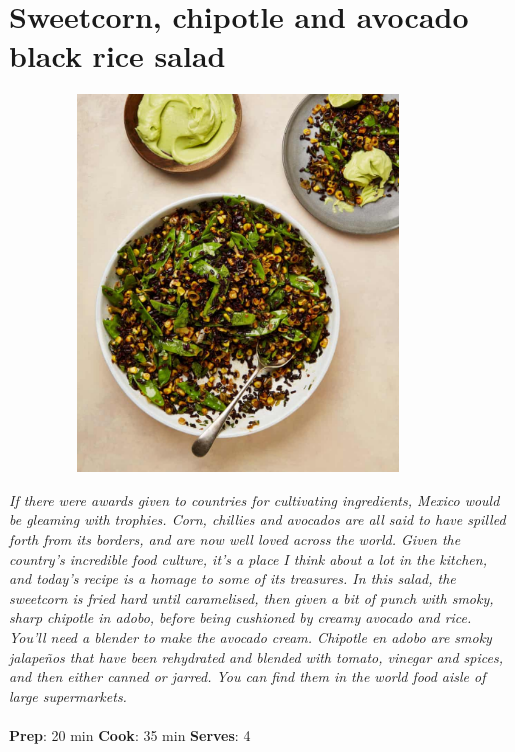 \documentclass{book}
\begin{document}
\section{Sweetcorn, chipotle and avocado black rice salad}
\begin{figure}
\centering\includegraphics[width=10cm,height=10cm,keepaspectratio]{Recipe_Pictures/Sweetcorn,_chipotle_and_avocado_black_rice_salad.png}
\end{figure}
\emph{If there were awards given to countries for cultivating ingredients, Mexico would be gleaming with trophies. Corn, chillies and avocados are all said to have spilled forth from its borders, and are now well loved across the world. Given the country’s incredible food culture, it’s a place I think about a lot in the kitchen, and today’s recipe is a homage to some of its treasures. In this salad, the sweetcorn is fried hard until caramelised, then given a bit of punch with smoky, sharp chipotle in adobo, before being cushioned by creamy avocado and rice.\\ 
You’ll need a blender to make the avocado cream. Chipotle en adobo are smoky jalapeños that have been rehydrated and blended with tomato, vinegar and spices, and then either canned or jarred. You can find them in the world food aisle of large supermarkets.}\\\\ 
\textbf{Prep}: 20 min
\textbf{Cook}: 35 min
\textbf{Serves}: 4
\end{document}
